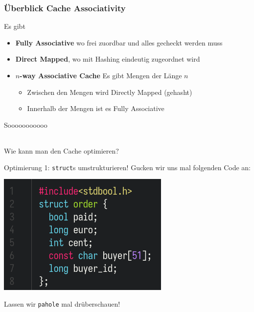 \documentclass{beamer}
\begin{document}
\begin{frame}
\frametitle{\"Uberblick Cache Associativity}
Es gibt
\begin{itemize}
    
    \item \textbf{Fully Associative} wo frei zuordbar und alles gecheckt werden muss
    
    \item \textbf{Direct Mapped}, wo mit Hashing eindeutig zugeordnet wird
    
    \item \textbf{$n$-way Associative Cache} Es gibt Mengen der L\"ange $n$
    
    \begin{itemize}
        \item Zwischen den Mengen wird Directly Mapped (gehasht)
        
        \item Innerhalb der Mengen ist es Fully Associative
    \end{itemize}
\end{itemize}
\end{frame}



%
%
\begin{frame}
\centering
{
\Huge Sooooooooooo\\~\\
}

Wie kann man den Cache optimieren?
\end{frame}

%
% 


%
\begin{frame}{Optimierung 1: \texttt{struct}s umstrukturieren!}
Gucken wir uns mal folgenden Code an:
\centerline{\includegraphics[height=6cm]{example1.png}}

Lassen wir \texttt{pahole} mal dr\"uberschauen!
\end{frame}
\end{document}
